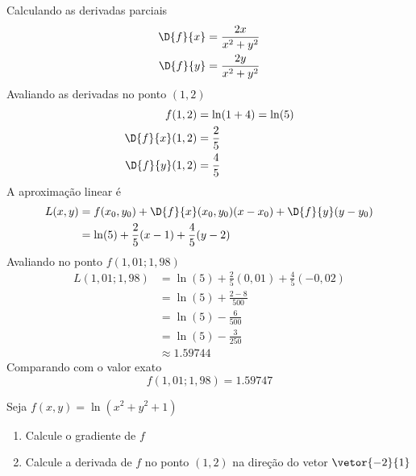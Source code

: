 \documentclass[a4paper,12pt,fleqn]{article}
\begin{document}
\begin{answer}
  Calculando as derivadas parciais
  \begin{align*}
    \D{f}{x} & = \frac{2x}{x^2 + y^2} \\
    \D{f}{y} & = \frac{2y}{x^2 + y^2}
  \end{align*}
  Avaliando as derivadas no ponto $(1, 2)$
  \begin{align*}
    f(1, 2)        & = \ln(1 + 4) = \ln(5) \\
    \D{f}{x}(1, 2) & = \frac{2}{5}         \\
    \D{f}{y}(1, 2) & = \frac{4}{5}
  \end{align*}
  A aproximação linear é
  \begin{align*}
    L(x, y) & = f(x_0, y_0) + \D{f}{x}(x_0, y_0)(x-x_0) + \D{f}{y}(y-y_0) \\
            & = \ln(5) + \frac{2}{5}(x - 1) + \frac{4}{5}(y - 2)
  \end{align*}
  Avaliando no ponto $f(1,01; 1,98)$
  \begin{align*}
    L(1,01; 1,98) & = \ln(5) + \frac{2}{5}(0,01) + \frac{4}{5}(-0,02) \\
                  & = \ln(5) + \frac{2-8}{500} \\
                  & = \ln(5) - \frac{6}{500} \\
                  & = \ln(5) - \frac{3}{250} \\
                  & \approx 1.59744
  \end{align*}
  Comparando com o valor exato
  \[
    f(1,01; 1,98) = 1.59747
  \]
\end{answer}

Seja \( f(x, y) = \ln(x^2 + y^2 + 1) \)
\begin{enumerate}[label=\alph*)]
  \item Calcule o gradiente de $f$
  \item Calcule a derivada de $f$ no ponto $(1, 2)$ na direção do vetor $\vetor{-2}{1}$
\end{enumerate}
\clearpagequestiononly
\end{document}
